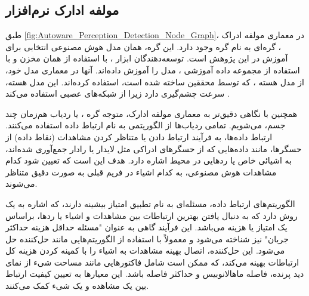 \subsection{مولفه ادارک نرم‌افزار }
  
  طبق \cref{fig:Autoware_Perception_Detection_Node_Graph}، در معماری مولفه ادراک ، گره‌ای به نام گره  وجود دارد. این گره، همان مدل هوش‌ مصنوعی انتخابی برای آموزش در این پژوهش است. توسعه‌دهندگان ابزار ، با استفاده از همان مخزن  و با استفاده از مجموعه داده آموزشی ، مدل  را آموزش داده‌اند. آنها در معماری مدل خود، از مدل هسته‌ ، که توسط محققین  ساخته شده است، استفاده کرده‌اند. این مدل هسته، سرعت چشم‌گیری دارد زیرا از شبکه‌های عصبی  استفاده می‌کند \cite{lang2019pointpillars}.
  
  همچنین با نگاهی دقیق‌تر به معماری مولفه ادارک، متوجه گره ، یا ردیاب هم‌زمان چند جسم، می‌شویم.
  تمامی ردیاب‌ها از الگوریتمی به نام ارتباط داده استفاده می‌کنند. ارتباط داده‌ها، به فرآیند ارتباط دادن یا متناظر کردن مشاهدات (نقاط داده) از حسگرها، مانند داده‌هایی که از حسگر‌های ادراکی مثل لایدار یا رادار جمع‌آوری شده‌اند، به اشیائی خاص یا ردهایی در محیط اشاره دارد. هدف این است که تعیین شود کدام مشاهدات هوش مصنوعی، به کدام اشیاء در فریم قبلی به صورت دقیق متناظر می‌شوند.

الگوریتم‌های ارتباط داده، مسئله‌ای به نام تطبیق امتیاز بیشینه دارند، که اشاره به یک روش دارد که به دنبال یافتن بهترین ارتباطات بین مشاهدات و اشیاء یا ردها، براساس یک امتیاز یا هزینه می‌باشد. این فرآیند گاهی به عنوان "مسئله حداقل هزینه حداکثر جریان" نیز شناخته می‌شود و معمولاً با استفاده از الگوریتم‌هایی مانند حل‌کننده  حل می‌شود. این حل‌کننده، اتصال بهینه مشاهدات به اشیاء را با کمینه کردن هزینه کل ارتباطات بهینه می‌کند، که ممکن است شامل فاکتورهایی مانند مساحت شیء از نمای دید پرنده، فاصله ماهالانوبیس و حداکثر فاصله باشد. این معیارها به تعیین کیفیت ارتباط بین یک مشاهده و یک شیء کمک می‌کنند.

